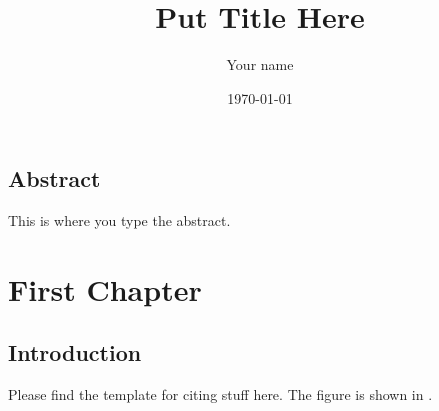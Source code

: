 \documentclass{icldt}
\newcommand{\HRule}{\rule{\linewidth}{0.5mm}}
\begin{document}
\title{Put Title Here}
\author{Your name}
\date{\today}

\maketitle
\newpage


\section*{Abstract}

This is where you type the abstract.

\newpage
\tableofcontents
\newpage
\listoftables
\newpage
\listoffigures

\newpage
{}

\chapter{First Chapter}
\section{Introduction}

Please find the template for citing stuff here. The figure is shown in . 
\end{document}
